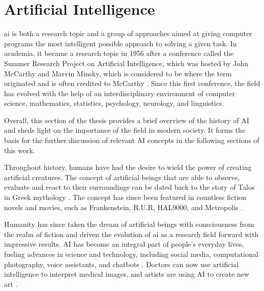 \label{sec:2_background_theory}


\section{Artificial Intelligence}

\gls{ai} is both a research topic and a group of approaches aimed at giving computer programs the most intelligent possible approach to solving a given task. In academia, it became a research topic in 1956 after a conference called the Summer Research Project on Artificial Intelligence, which was hosted by John McCarthy and Marvin Minsky, which is considered to be where the term originated and is often credited to McCarthy \cite{mccarthyProposalDartmouthSummer2006, andresenJohnMcCarthyFather2002}. Since this first conference, the field has evolved with the help of an interdisciplinary environment of computer science, mathematics, statistics, psychology, neurology, and linguistics.

Overall, this section of the thesis provides a brief overview of the history of AI and sheds light on the importance of the field in modern society. It forms the basis for the further discussion of relevant AI concepts in the following sections of this work.

Throughout history, humans have had the desire to wield the power of creating artificial creatures. The concept of artificial beings that are able to observe, evaluate and react to their surroundings can be dated back to the story of Talos in Greek mythology \cite{universityAncientMythsReveal2019}. The concept has since been featured in countless fiction novels and movies, such as Frankenstein, R.U.R, HAL9000, and Metropolis \cite{shelleyFrankensteinModernPrometheus1992, capekRossumUniversalRobots, kubrick2001SpaceOdyssey1969, langMetropolis1927a}. 

Humanity has since taken the dream of artificial beings with consciousness from the realm of fiction and driven the evolution of \gls{ai} as a research field forward with impressive results. 
AI has become an integral part of people's everyday lives, fueling advances in science and technology, including social media, computational photography, voice assistants, and chatbots \cite{barbastathisUseDeepLearning, hoyAlexaSiriCortana2018, biswasRoleChatGPT2023}. Doctors can now use artificial intelligence to interpret medical images, and artists are using AI to create new art \cite{wangMachineLearningRadiology2012, thrallArtificialIntelligenceMachine2018}.


